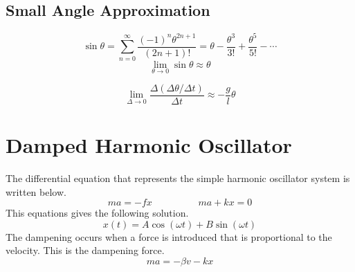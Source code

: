 \vspace{1cm}

\subsection{Small Angle Approximation}
$$\sin \theta=\sum_{n=0}^{\infty} \frac{(-1)^n\theta^{2n+1}}{(2n+1)!}=\theta-\frac{\theta^3}{3!}+\frac{\theta^5}{5!}-\cdots$$
$$\lim_{\theta \rightarrow 0} \sin \theta \approx \theta$$

$$\lim_{\Delta \rightarrow 0} \frac{\Delta (\Delta \theta / \Delta t)}{\Delta t}\approx-\frac{g}{l}\theta$$


\section{Damped Harmonic Oscillator}
\normalsize
The differential equation that represents the simple harmonic oscillator system is written below.
$$ma=-fx \hspace{2cm} ma+kx=0$$
This equations gives the following solution.
$$x(t)=A\cos(\omega t)+B\sin(\omega t) $$
The dampening occurs when a force is introduced that is proportional to the velocity.  This is the dampening force.
$$ma=-\beta v-kx$$
